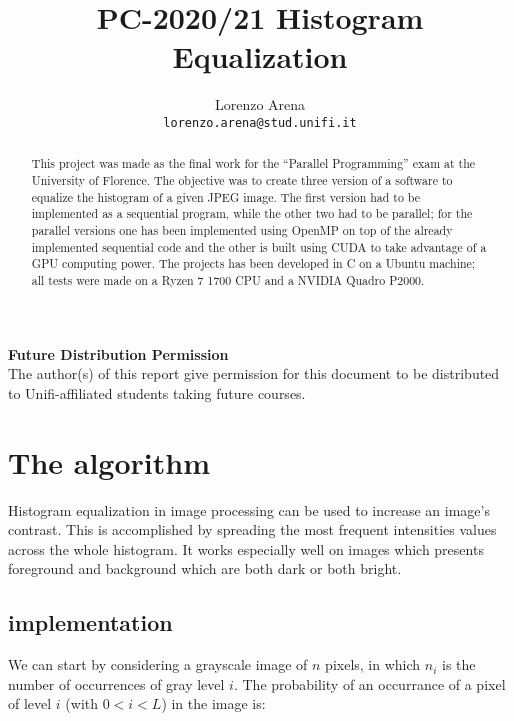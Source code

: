 \documentclass[10pt,twocolumn,letterpaper]{article}
\begin{document}
\title{PC-2020/21 Histogram Equalization}

\author{Lorenzo Arena\\
{\tt\small lorenzo.arena@stud.unifi.it}
}

\maketitle
\thispagestyle{empty}

\begin{abstract}
    This project was made as the final work for the “Parallel Programming”
    exam at the University of Florence. The objective was to create three
    version of a software to equalize the histogram of a given JPEG image.
    The first version had to be implemented as a sequential program, while
    the other two had to be parallel; for the parallel versions one has
    been implemented using OpenMP on top of the already implemented sequential
    code and the other is built using CUDA to take advantage of a GPU computing
    power. The projects has been developed in C on a Ubuntu machine; all
    tests were made on a Ryzen 7 1700 CPU and a NVIDIA Quadro P2000.
 \end{abstract}

\noindent\large\textbf{Future Distribution Permission}\\
\indent The author(s) of this report give permission for this document to be
        distributed to Unifi-affiliated students taking future courses.

\section{The algorithm}

Histogram equalization in image processing can be used to increase an image's
contrast. This is accomplished by spreading the most frequent intensities
values across the whole histogram. It works especially well on images which
presents foreground and background which are both dark or both bright.

\subsection{implementation}

We can start by considering a grayscale image of \(n\) pixels, in which \(n_i\)
is the number of occurrences of gray level \(i\). The probability of an occurrance
of a pixel of level \(i\) (with \(0 < i < L\)) in the image is:
\end{document}

